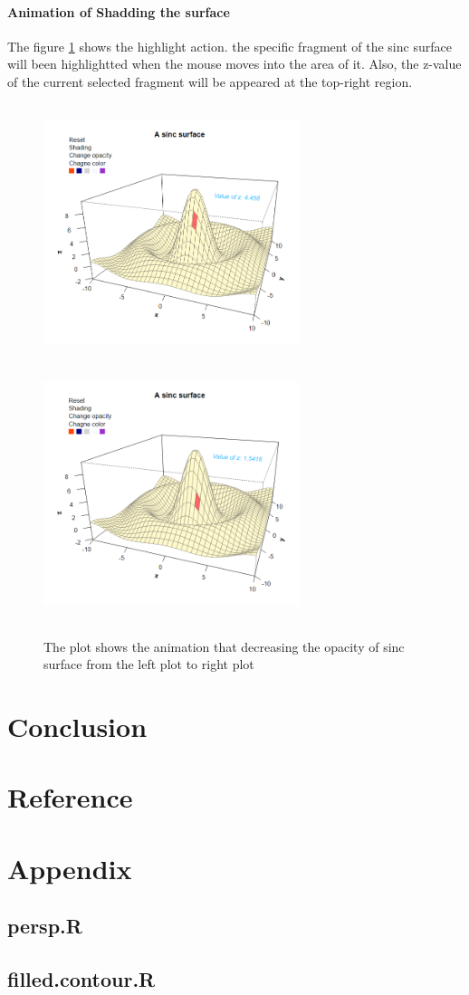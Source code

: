 \documentclass[paper=a4, fontsize=11pt]{report}
\begin{document}
\subsubsection*{Animation of Shadding the surface}
The figure \ref{Example_6.3.4} shows the highlight action. the specific fragment of the sinc surface will been highlightted when the mouse moves into the area of it. Also, the z-value of the current selected fragment will be appeared at the top-right region. 
\begin{figure}[h]
\begin{center}
  \includegraphics[height = 7.5cm, width = 7.5cm]{figure/svg/hlight_1.PNG}
  \includegraphics[height = 7.5cm, width = 7.5cm]{figure/svg/hlight_2.PNG}
  \caption{The plot shows the animation that decreasing the opacity of sinc surface from the left plot to right plot}
  	\label{Example_6.3.4}
\end{center}
\end{figure}

\chapter{Conclusion}
\chapter{Reference}
\chapter{Appendix}
\section{persp.R}
\section{filled.contour.R}
\end{document}
